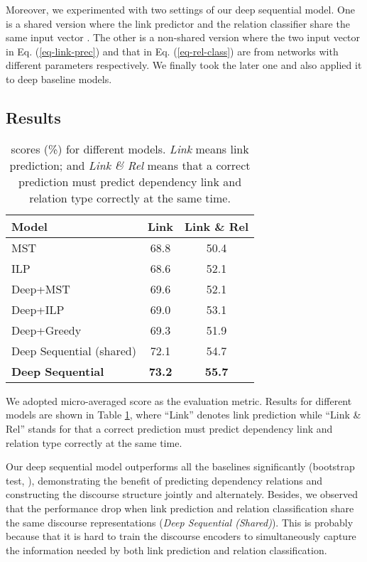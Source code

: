 \documentclass[letterpaper]{article} \usepackage{aaai19}  \usepackage{times}  \usepackage{helvet}  \usepackage{courier}  \usepackage{url}  \usepackage{graphicx}  \usepackage{amssymb}
\begin{document}
Moreover, we experimented with two settings of our deep sequential model. One is a shared version where the link predictor and the relation classifier share the same input vector . The other is a non-shared version where the two input vector  in Eq. (\ref{eq-link-prec}) and that in Eq. (\ref{eq-rel-class}) are from networks with different parameters respectively. We finally took the later one and also applied it to deep baseline models.

\subsection{Results}

\begin{table}[ht]
  \centering
  \begin{tabular}{l|c|c}
    \hline
    Model & Link & Link \& Rel\\
    \hline
    MST & 68.8 & 50.4\\ 
    ILP & 68.6 & 52.1\\
    Deep+MST & 69.6 & 52.1 \\
    Deep+ILP & 69.0 & 53.1 \\
    Deep+Greedy & 69.3 & 51.9 \\
    \hline
    Deep Sequential (shared) & 72.1 & 54.7 \\
    \textbf{Deep Sequential} & \textbf{73.2} & \textbf{55.7} \\
    \hline
  \end{tabular}
  \caption{ scores (\%) for different models. {\it Link} means link prediction; and {\it Link \& Rel} means that a correct prediction must predict dependency link and relation type correctly at the same time.}
  \label{main_results}
\end{table}

We adopted micro-averaged  score as the evaluation metric.
Results for different models are shown in Table \ref{main_results}, where ``Link'' denotes link prediction while ``Link \& Rel'' stands for that a correct prediction must predict dependency link and relation type correctly at the same time.

Our deep sequential model outperforms all the baselines significantly (bootstrap test, ), demonstrating the benefit of predicting dependency relations and constructing the discourse structure jointly and alternately.
Besides, we observed that the performance drop when link prediction and relation classification share the same discourse representations (\emph{Deep Sequential (Shared)}).
This is probably because that it is hard to train the discourse encoders to simultaneously capture the information needed by both link prediction and relation classification.
\end{document}
